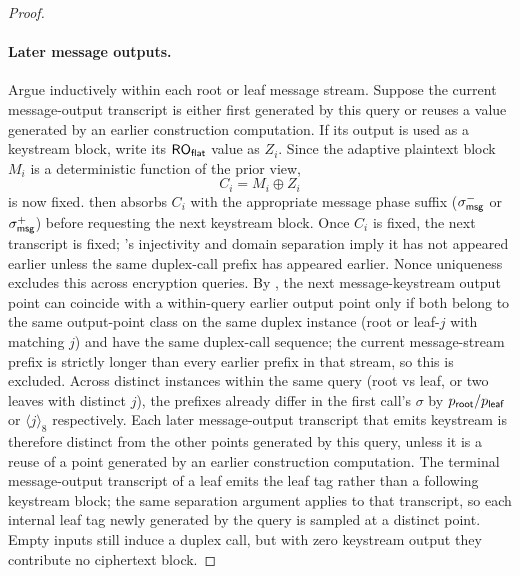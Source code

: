 \begin{proof}
\paragraph{Later message outputs.}
Argue inductively within each root or leaf message stream. Suppose
the current message-output transcript is either first generated by this
query or reuses a value generated by an earlier construction computation.
If its output is used as a keystream block, write its $\mathsf{RO}_{\mathsf{flat}}$ value as
$Z_i$. Since the adaptive plaintext block $M_i$ is a deterministic
function of the prior view,
\[
  C_i = M_i \oplus Z_i
\]
is now fixed. \TW{} then absorbs $C_i$ with the appropriate message
phase suffix ($\sigma_{\mathsf{msg}}^-$ or
$\sigma_{\mathsf{msg}}^+$) before requesting the next keystream block. Once $C_i$ is fixed, the next transcript is
fixed; 's injectivity and domain separation
imply it has not appeared earlier unless the same duplex-call prefix
has appeared earlier. Nonce uniqueness excludes this across encryption
queries. By , the next message-keystream output
point can coincide with a within-query earlier output point only if
both belong to the same output-point class on the same duplex
instance (root or leaf-$j$ with matching $j$) and have the same
duplex-call sequence; the current message-stream prefix is strictly
longer than every earlier prefix in that stream, so this is excluded.
Across distinct instances within the same query (root vs leaf, or
two leaves with distinct $j$), the prefixes already differ in the
first call's $\sigma$ by $p_{\mathsf{root}} /
p_{\mathsf{leaf}}$ or $\langle j \rangle_8$ respectively. Each
later message-output transcript that emits keystream is therefore
distinct from the other points generated by this query, unless it is a
reuse of a point generated by an earlier construction computation. The
terminal message-output transcript of a leaf emits
the leaf tag rather than a following keystream block; the same
separation argument applies to that transcript, so each internal leaf
tag newly generated by the query is sampled at a distinct point. Empty
inputs still induce a duplex call, but with zero keystream output they
contribute no ciphertext block.


\end{proof}
